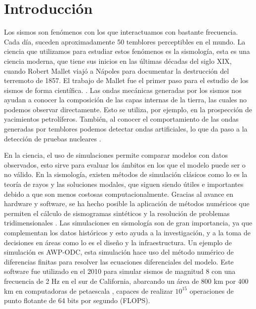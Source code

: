 \chapter{Introducción}
Los sismos son fenómenos con los que interactuamos con bastante frecuencia. Cada día, suceden aproximadamente 50 temblores perceptibles en el mundo. La ciencia que utilizamos para estudiar estos fenómenos es la sismología, esta es una ciencia moderna, que tiene sus inicios en las últimas décadas del siglo XIX, cuando Robert Mallet viajó a Nápoles para documentar la destrucción del terremoto de 1857. El trabajo de Mallet fue el primer paso para el estudio de los sismos de forma científica. \cite[2-3]{Shearer2019}. Las ondas mecánicas generadas por los sismos nos ayudan a conocer la composición de las capas internas de la tierra, las cuales no podemos observar directamente. Esto se utiliza, por ejemplo, en la prospección de yacimientos petrolíferos. También, al conocer el comportamiento de las ondas generadas por temblores podemos detectar ondas artificiales, lo que da paso a la detección de pruebas nucleares \cite[1, 5, 8]{Shearer2019}.

En la ciencia, el uso de simulaciones permite comparar modelos con datos observados, esto sirve para evaluar los ámbitos en los que el modelo puede ser o no válido. En la sismología, existen métodos de simulación clásicos como lo es la teoría de rayos y las soluciones modales, que siguen siendo útiles e importantes debido a que son menos costosas computacionalmente. Gracias al avance en hardware y software, se ha hecho posible la aplicación de métodos numéricos que permiten el cálculo de sismogramas sintéticos y la resolución de problemas tridimensionales \cite[1-2]{Igel2016}. Las simulaciones en sismología son de gran importancia, ya que complementan los datos históricos y esto ayuda a la investigación, y a la toma de decisiones en áreas como lo es el diseño y la infraestructura. Un ejemplo de simulación es AWP-ODC, esta simulación hace uso del método numérico de diferencias finitas para resolver las ecuaciones diferenciales del modelo. Este software fue utilizado en el 2010 para simular sismos de magnitud 8 con una frecuencia de 2 Hz en el sur de California, abarcando un área de 800 km por 400 km en computadoras de petaescala \cite{Cui2010}, capaces de realizar $10^{15}$ operaciones de punto flotante de 64 bits por segundo (FLOPS).

